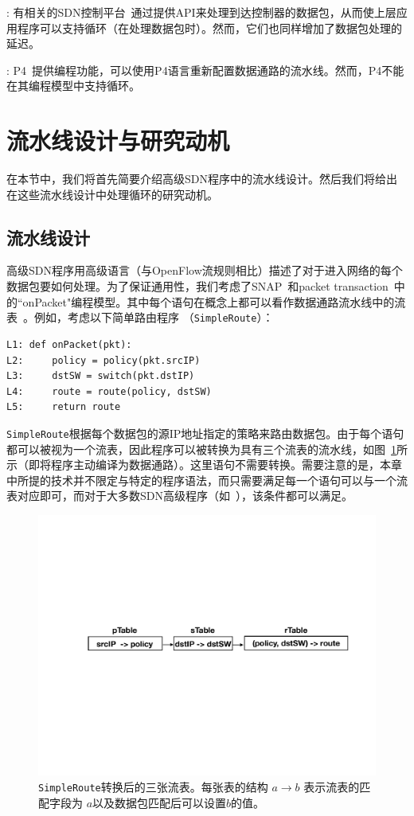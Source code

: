 : 有相关的SDN控制平台~\cite{odl,erickson2013beacon,gude2008nox,floodlight}通过提供API来处理到达控制器的数据包，从而使上层应用程序可以支持循环（在处理数据包时）。然而，它们也同样增加了数据包处理的延迟。

: P4~\cite{P4}提供编程功能，可以使用P4语言重新配置数据通路的流水线。然而，P4不能在其编程模型中支持循环。


\section{流水线设计与研究动机}
\label{sec:motivation}

在本节中，我们将首先简要介绍高级SDN程序中的流水线设计。然后我们将给出在这些流水线设计中处理循环的研究动机。

\subsection{流水线设计}
高级SDN程序用高级语言（与OpenFlow流规则相比）描述了对于进入网络的每个数据包要如何处理。为了保证通用性，我们考虑了SNAP~\cite{snap}和packet transaction~\cite{sivaraman2016packet}中的``onPacket"编程模型。其中每个语句在概念上都可以看作数据通路流水线中的流表~\cite{snap,sivaraman2016packet}。例如，考虑以下简单路由程序 （\texttt{SimpleRoute}）：

\begin{small}
\begin{verbatim}
L1: def onPacket(pkt):
L2:     policy = policy(pkt.srcIP)
L3:     dstSW = switch(pkt.dstIP)
L4:     route = route(policy, dstSW)
L5:     return route
\end{verbatim}
\end{small}

\texttt{SimpleRoute}根据每个数据包的源IP地址指定的策略来路由数据包。由于每个语句都可以被视为一个流表，因此程序可以被转换为具有三个流表的流水线，如图~\ref{fig:srp}所示（即将程序主动编译为数据通路）。这里语句不需要转换。需要注意的是，本章中所提的技术并不限定与特定的程序语法，而只需要满足每一个语句可以与一个流表对应即可，而对于大多数SDN高级程序（如~\cite{snap,sivaraman2016packet}），该条件都可以满足。

\begin{figure}[!htbp]
\includegraphics[width=0.6\linewidth]{figures/lp-65.pdf}
\centering
\vspace{-3mm}
\caption{\small \texttt{SimpleRoute}转换后的三张流表。每张表的结构 $a \rightarrow b$ 表示流表的匹配字段为 $a$以及数据包匹配后可以设置$b$的值。}
\label{fig:srp}
\end{figure}

